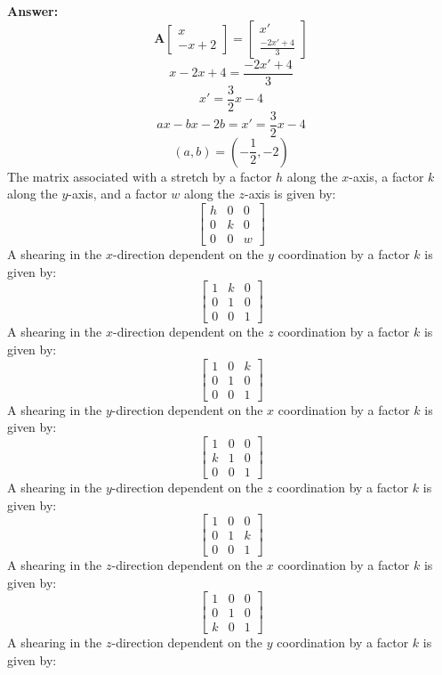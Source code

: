 \documentclass[a4paper,12pt]{report}
\begin{document}
\textbf{Answer:} 
\[\mathbf{A}\begin{bmatrix}x\\ -x+2\end{bmatrix}=\begin{bmatrix}x'\\ \frac{-2x'+4}{3}\end{bmatrix}\]
\[x-2x+4=\frac{-2x'+4}{3}\]
\[x'=\frac{3}{2}x-4\]
\[ax-bx-2b=x'=\frac{3}{2}x-4\]
\[(a, b)=(-\frac{1}{2}, -2)\]
The matrix associated with a stretch by a factor $h$ along the $x$-axis, a factor $k$ along the $y$-axis, and a factor $w$ along the $z$-axis is given by:
\[\begin{bmatrix}
h & 0 & 0 \\
0 & k & 0 \\
0 & 0 & w
\end{bmatrix}\]
A shearing in the $x$-direction dependent on the $y$ coordination by a factor $k$ is given by:
\[\begin{bmatrix}
1 & k & 0 \\
0 & 1 & 0 \\
0 & 0 & 1
\end{bmatrix}\]
A shearing in the $x$-direction dependent on the $z$ coordination by a factor $k$ is given by:
\[\begin{bmatrix}
1 & 0 & k \\
0 & 1 & 0 \\
0 & 0 & 1
\end{bmatrix}\]
A shearing in the $y$-direction dependent on the $x$ coordination by a factor $k$ is given by:
\[\begin{bmatrix}
1 & 0 & 0 \\
k & 1 & 0 \\
0 & 0 & 1
\end{bmatrix}\]
A shearing in the $y$-direction dependent on the $z$ coordination by a factor $k$ is given by:
\[\begin{bmatrix}
1 & 0 & 0 \\
0 & 1 & k \\
0 & 0 & 1
\end{bmatrix}\]
A shearing in the $z$-direction dependent on the $x$ coordination by a factor $k$ is given by:
\[\begin{bmatrix}
1 & 0 & 0 \\
0 & 1 & 0 \\
k & 0 & 1
\end{bmatrix}\]
A shearing in the $z$-direction dependent on the $y$ coordination by a factor $k$ is given by:
\end{document}
